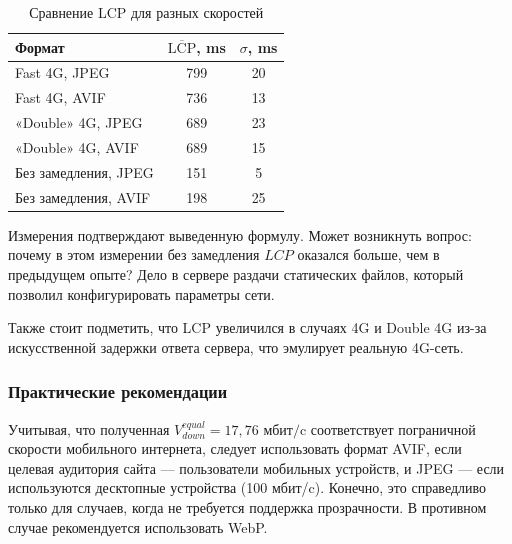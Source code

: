 \documentclass[12pt]{article}
\begin{document}
\begin{table}[H]
    \centering
    \caption{Сравнение LCP для разных скоростей}
    \begin{tabular}{l S[table-format=3.2] S[table-format=2.2]}
        \toprule
        Формат               & {$\overline{\text{LCP}}$, \si{\milli\second}} & {$\sigma$, \si{\milli\second}} \\
        \midrule
        Fast 4G, JPEG        & 799                                           & 20                             \\
        Fast 4G, AVIF        & 736                                           & 13                             \\
        «Double» 4G, JPEG    & 689                                           & 23                             \\
        «Double» 4G, AVIF    & 689                                           & 15                             \\
        Без замедления, JPEG & 151                                           & 5                              \\
        Без замедления, AVIF & 198                                           & 25                             \\
        \bottomrule
    \end{tabular}
\end{table}

Измерения подтверждают выведенную формулу. Может возникнуть вопрос: почему в этом измерении без замедления $LCP$ оказался больше, чем в предыдущем опыте?
Дело в сервере раздачи статических файлов, который позволил конфигурировать параметры сети.

Также стоит подметить, что LCP увеличился в случаях 4G и Double 4G из-за искусственной задержки ответа сервера,
что эмулирует реальную 4G-сеть.

\subsubsection{Практические рекомендации}

Учитывая, что полученная $V^{equal}_{down} = 17{,}76 \text{ мбит/c}$ соответствует пограничной скорости мобильного интернета,
следует использовать формат AVIF, если целевая аудитория сайта — пользователи мобильных устройств,
и JPEG — если используются десктопные устройства (100 мбит/c). Конечно, это справедливо только для случаев,
когда не требуется поддержка прозрачности. В противном случае рекомендуется использовать WebP.
\end{document}
